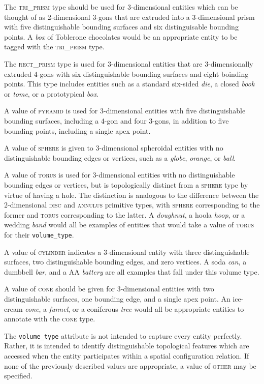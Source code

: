 \documentclass[11pt]{article}
\begin{document}
The \textsc{tri\_prism} type should be used for 3-dimensional entities which can be thought of as 2-dimensional 3-gons that are extruded into a 3-dimensional prism with five distinguishable bounding surfaces and six distinguisable bounding points. A \emph{box} of Toblerone chocolates would be an appropriate entity to be tagged with the \textsc{tri\_prism} type.

The \textsc{rect\_prism} type is used for 3-dimensional entities that are 3-dimensionally extruded 4-gons with six distinguishable bounding surfaces and eight boinding points. This type includes entities such as a standard six-sided \emph{die}, a closed \emph{book} or \emph{tome}, or a prototypical \emph{box}. 

A value of \textsc{pyramid} is used for 3-dimensional entities with five distinguishable bounding surfaces, including a 4-gon and four 3-gons, in addition to five bounding points, including a single apex point.

A value of \textsc{sphere} is given to 3-dimensional spheroidal entities with no distinguishable bounding edges or vertices, such as a \emph{globe}, \emph{orange}, or \emph{ball}.

A value of \textsc{torus} is used for 3-dimensional entities with no distinguishable bounding edges or vertices, but is topologically distinct from a \textsc{sphere} type by virtue of having a hole. The distinction is analogous to the difference between the 2-dimensional \textsc{disc} and \textsc{annulus} primitive types, with \textsc{sphere} corresponding to the former and \textsc{torus} corresponding to the latter. A \emph{doughnut}, a hoola \emph{hoop}, or a wedding \emph{band} would all be examples of entities that would take a value of \textsc{torus} for their \texttt{volume\_type}.

A value of \textsc{cylinder} indicates a 3-dimensional entity with three distinguishable surfaces, two distinguishable bounding edges, and zero vertices. A soda \emph{can}, a dumbbell \emph{bar}, and a AA \emph{battery} are all examples that fall under this volume type.

A value of \textsc{cone} should be given for 3-dimensional entities with two distinguishable surfaces, one bounding edge, and a single apex point. An ice-cream \emph{cone}, a \emph{funnel}, or a coniferous \emph{tree} would all be appropriate entities to annotate with the \textsc{cone} type.

The \texttt{volume\_type} attribute is not intended to capture every entity perfectly. Rather, it is intended to identify distinguishable topological features which are accessed when the entity participates within a spatial configuration relation. If none of the previously described values are appropriate, a value of \textsc{other} may be specified.
\end{document}
